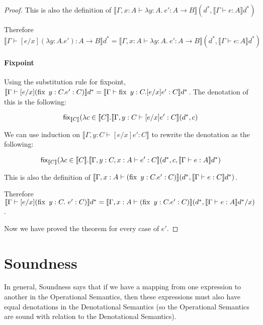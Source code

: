 \begin{proof}
This is also the definition of $\llbracket \Gamma, x : A \vdash \lambda y : A. \ e' : A \to B \rrbracket (d^*, \llbracket \Gamma \vdash e : A \rrbracket d^*)$

Therefore $\llbracket \Gamma \vdash [e/x](\lambda y : A.e') : A \to B \rrbracket d^* = \llbracket \Gamma, x : A \vdash \lambda y : A. \ e' : A \to B \rrbracket (d^*, \llbracket \Gamma \vdash e : A \rrbracket d^*)$


\paragraph{Fixpoint} Using the substitution rule for fixpoint, $\llbracket \Gamma \vdash [e/x](\operatorname{fix} \ y : C . e' : C) \rrbracket d^* = \llbracket \Gamma \vdash \operatorname{fix} \ y : C . [e/x]e' : C \rrbracket d^*$. The denotation of this is the following:

\[\operatorname{\mathsf{fix}}_{\llbracket C \rrbracket} (\lambda c \in \llbracket C \rrbracket . \llbracket \Gamma, y : C \vdash [e/x]e' : C \rrbracket (d^*, c)\]

 We can use induction on $\llbracket \Gamma, y : C \vdash [e/x]e' : C \rrbracket$ to rewrite the denotation as the following:

\[\operatorname{\mathsf{fix}}_{\llbracket C \rrbracket} (\lambda c \in \llbracket C \rrbracket . \llbracket \Gamma, y : C, x : A \vdash e' : C \rrbracket (d^*, c, \llbracket \Gamma \vdash e : A \rrbracket d^*)\] 

This is also the definition of $\llbracket \Gamma, x : A \vdash (\operatorname{fix} \ y : C . e' : C) \rrbracket (d^*, \llbracket \Gamma \vdash e : C \rrbracket d^*)$.

\vspace{0.25cm}

Therefore $\llbracket \Gamma \vdash [e/x](\operatorname{fix} \ y : C . \ e' : C) \rrbracket d^* = \llbracket \Gamma, x : A \vdash (\operatorname{fix} \ y : C . e' : C) \rrbracket (d^*, \llbracket \Gamma \vdash e : A \rrbracket d^* / x)$.

\vspace{0.25cm}

Now we have proved the theorem for every case of $e'$.
\end{proof}

\section{Soundness}\label{sound}
In general, Soundness says that if we have a mapping from one expression to another in the Operational Semantics, then these expressions must also have equal denotations in the Denotational Semantics (so the Operational Semantics are sound with relation to the Denotational Semantics).
 
